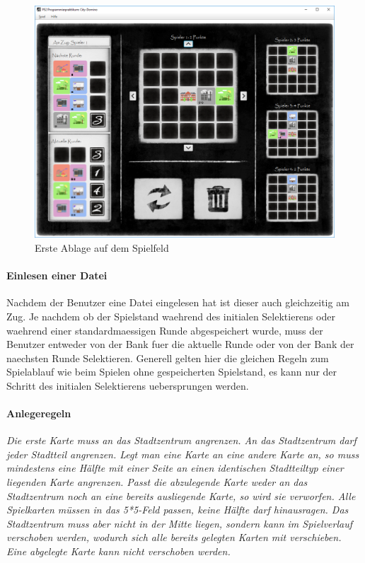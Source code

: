 \begin{figure}
	\centering
	\includegraphics{screenshots/screenshot_ErsteAblage.png}
	\caption[Erste Ablage]{Erste Ablage auf dem Spielfeld}
	\label{fig:ersteAblage}
\end{figure}

\paragraph{Einlesen einer Datei}
Nachdem der Benutzer eine Datei eingelesen hat ist dieser auch gleichzeitig am Zug. Je nachdem ob der Spielstand waehrend des initialen Selektierens oder waehrend einer standardmaessigen Runde abgespeichert wurde, muss der Benutzer entweder von der Bank fuer die aktuelle Runde oder von der Bank der naechsten Runde Selektieren. Generell gelten hier die gleichen Regeln zum Spielablauf wie beim Spielen ohne gespeicherten Spielstand, es kann nur der Schritt des initialen Selektierens uebersprungen werden. 

\paragraph{Anlegeregeln}
\emph{Die erste Karte muss an das Stadtzentrum angrenzen. An das Stadtzentrum darf jeder Stadtteil angrenzen. Legt man eine Karte an eine andere Karte an, so muss mindestens eine Hälfte mit einer Seite an einen identischen Stadtteiltyp einer liegenden Karte angrenzen. Passt die abzulegende Karte weder an das Stadtzentrum noch an eine bereits ausliegende Karte, so wird sie verworfen. Alle Spielkarten müssen in das 5*5-Feld passen, keine Hälfte darf hinausragen. Das Stadtzentrum muss aber nicht in der Mitte liegen, sondern kann im Spielverlauf verschoben werden, wodurch sich alle bereits gelegten Karten mit verschieben. Eine abgelegte Karte kann nicht verschoben werden.}
\cite{aufgabenstellung}

